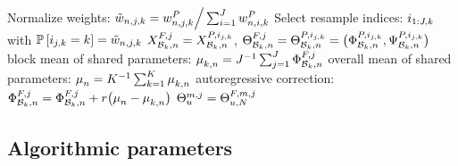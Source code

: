 \documentclass[12pt]{article}\usepackage[]{graphicx}\usepackage[]{xcolor}
\begin{document}
\begin{algorithm}[H]
{{{      Normalize weights:
        $\tilde{w}_{n,j, k}= w^P_{n,j,k}\Big/
        \sum_{i=1}^{J}w^P_{n,i,k}$\;
      Select resample indices:
        $i_{1:J,k}$ with
        $\mathbb{P}\left[i_{j,k}=k\right] =
        \tilde{w}_{n,j,k}$
      \;
         $X_{\mathcal{B}_{k},n}^{F,j}=X_{\mathcal{B}_{k},n}^{P,i_{j,k}}$,
	$\Theta_{\mathcal{B}_{k},n}^{F,j}
	  =\Theta_{\mathcal{B}_{k},n}^{P,i_{j,k}}
	  =\big(\Phi_{\mathcal{B}_{k},n}^{P,i_{j,k}},
	    \Psi_{\mathcal{B}_{k},n}^{P,i_{j,k}}\big)$
      \;
      block mean of shared parameters: $\mu_{k,n}^{} = J^{-1}\sum_{j=1}^{J} \Phi^{F,j}_{\mathcal{B}_{k},n}$
    } %
    overall mean of shared parameters: $\mu_{n}^{} = K^{-1}\sum_{k=1}^{K} \mu_{k,n}^{}$
    \;
    autoregressive correction:
    $\Phi^{F,j}_{\mathcal{B}_{k},n} = \Phi^{F,j}_{\mathcal{B}_{k},n} + r\big( \mu_{n}^{} - \mu_{k,n}^{}  \big)$
  \;
  }%
  $\Theta_{u}^{m,j}=\Theta^{F,m,j}_{u,N}$
  \;  
} %
\end{algorithm}	






\subsection{Algorithmic parameters}
\end{document}
